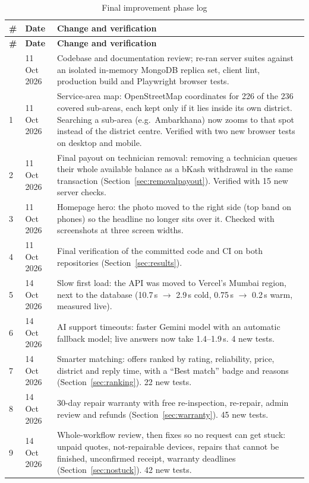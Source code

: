 \documentclass{standalone}
\begin{document}
{\small
\begin{longtable}{@{}p{0.6cm}p{2cm}p{11.4cm}@{}}
\caption{Final improvement phase log}\label{tab:finalphase}\\
\toprule
\textbf{\#} & \textbf{Date} & \textbf{Change and verification} \\
\midrule
\endfirsthead
\toprule
\textbf{\#} & \textbf{Date} & \textbf{Change and verification} \\
\midrule
\endhead
\bottomrule
\endfoot
0 & 11 Oct 2026 & Codebase and documentation review; re-ran server suites against an isolated in-memory MongoDB replica set, client lint, production build and Playwright browser tests. \\
1 & 11 Oct 2026 & Service-area map: OpenStreetMap coordinates for 226 of the 236 covered sub-areas, each kept only if it lies inside its own district. Searching a sub-area (e.g.\ Ambarkhana) now zooms to that spot instead of the district centre. Verified with two new browser tests on desktop and mobile. \\
2 & 11 Oct 2026 & Final payout on technician removal: removing a technician queues their whole available balance as a bKash withdrawal in the same transaction (Section~\ref{sec:removalpayout}). Verified with 15 new server checks. \\
3 & 11 Oct 2026 & Homepage hero: the photo moved to the right side (top band on phones) so the headline no longer sits over it. Checked with screenshots at three screen widths. \\
4 & 11 Oct 2026 & Final verification of the committed code and CI on both repositories (Section~\ref{sec:results}). \\
5 & 14 Oct 2026 & Slow first load: the API was moved to Vercel's Mumbai region, next to the database (10.7\,s $\rightarrow$ 2.9\,s cold, 0.75\,s $\rightarrow$ 0.2\,s warm, measured live). \\
6 & 14 Oct 2026 & AI support timeouts: faster Gemini model with an automatic fallback model; live answers now take 1.4--1.9\,s. 4 new tests. \\
7 & 14 Oct 2026 & Smarter matching: offers ranked by rating, reliability, price, district and reply time, with a ``Best match'' badge and reasons (Section~\ref{sec:ranking}). 22 new tests. \\
8 & 14 Oct 2026 & 30-day repair warranty with free re-inspection, re-repair, admin review and refunds (Section~\ref{sec:warranty}). 45 new tests. \\
9 & 14 Oct 2026 & Whole-workflow review, then fixes so no request can get stuck: unpaid quotes, not-repairable devices, repairs that cannot be finished, unconfirmed receipt, warranty deadlines (Section~\ref{sec:nostuck}). 42 new tests. \\

\end{longtable}}
\end{document}
